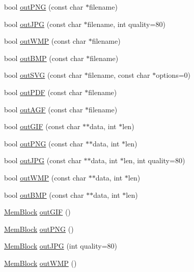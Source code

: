 \begin{DoxyCompactItemize}
bool \hyperlink{class_draw_area_a710a45aff2cda879fb743677ea81c98f}{out\+P\+NG} (const char $\ast$filename)
\item 
bool \hyperlink{class_draw_area_aab0ce24f4d0cb06f7b4618a7d1784c62}{out\+J\+PG} (const char $\ast$filename, int quality=80)
\item 
bool \hyperlink{class_draw_area_aa09ac5d0f9124a79ff87eac01e30fa7e}{out\+W\+MP} (const char $\ast$filename)
\item 
bool \hyperlink{class_draw_area_aa1a273e311c36f86f78943cc1d3ffff9}{out\+B\+MP} (const char $\ast$filename)
\item 
bool \hyperlink{class_draw_area_a1cb1704b9105de12e527e6fdf4a27070}{out\+S\+VG} (const char $\ast$filename, const char $\ast$options=0)
\item 
bool \hyperlink{class_draw_area_a13885f1e2559a146b6a1d147503a5a63}{out\+P\+DF} (const char $\ast$filename)
\item 
bool \hyperlink{class_draw_area_ab0754b856e76ed952c6888bcda401d19}{out\+A\+GF} (const char $\ast$filename)
\item 
bool \hyperlink{class_draw_area_ac6de24287102bd8e83aaf7a8c7e3eb56}{out\+G\+IF} (const char $\ast$$\ast$data, int $\ast$len)
\item 
bool \hyperlink{class_draw_area_a321d5bfa06ce6c67109cbd59ba656215}{out\+P\+NG} (const char $\ast$$\ast$data, int $\ast$len)
\item 
bool \hyperlink{class_draw_area_a276a1e2a0514b881c22162e6e97a5cb7}{out\+J\+PG} (const char $\ast$$\ast$data, int $\ast$len, int quality=80)
\item 
bool \hyperlink{class_draw_area_ad6cc14ce8c201bdf72d9b2a5bc0742d2}{out\+W\+MP} (const char $\ast$$\ast$data, int $\ast$len)
\item 
bool \hyperlink{class_draw_area_a1c3683131dd5a006465085c3462ea868}{out\+B\+MP} (const char $\ast$$\ast$data, int $\ast$len)
\item 
\hyperlink{class_mem_block}{Mem\+Block} \hyperlink{class_draw_area_aa3b58d71f07e7e558ad8895b0ea9ba95}{out\+G\+IF} ()
\item 
\hyperlink{class_mem_block}{Mem\+Block} \hyperlink{class_draw_area_a9adee147b431fd0253e92085c5543a3e}{out\+P\+NG} ()
\item 
\hyperlink{class_mem_block}{Mem\+Block} \hyperlink{class_draw_area_a67d04710973c1e875c4679ad48236462}{out\+J\+PG} (int quality=80)
\item 
\hyperlink{class_mem_block}{Mem\+Block} \hyperlink{class_draw_area_aca33765930d4a4c76bbf476b8580e171}{out\+W\+MP} ()
$$
\end{DoxyCompactItemize}
